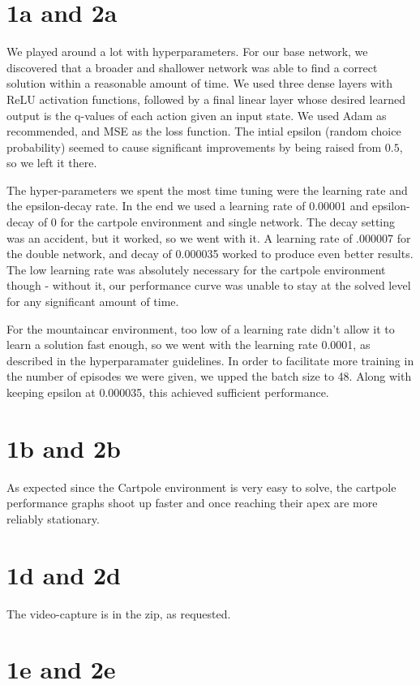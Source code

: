 \documentclass[12pt]{article}
\begin{document}
\begin{solution}
\section{1a and 2a}
We played around a lot with hyperparameters. For our base network, we discovered that a broader and shallower network was able to find a correct solution within a reasonable amount of time. We used three dense layers with ReLU activation functions, followed by a final linear layer whose desired learned output is the q-values of each action given an input state. We used Adam as recommended, and MSE as the loss function. The intial epsilon (random choice probability) seemed to cause significant improvements by being raised from $0.5$, so we left it there.

The hyper-parameters we spent the most time tuning were the learning rate and the epsilon-decay rate. In the end we used a learning rate of 0.00001 and epsilon-decay of 0 for the cartpole environment and single network. The decay setting was an accident, but it worked, so we went with it. A learning rate of .000007 for the double network, and decay of 0.000035 worked to produce even better results. The low learning rate was absolutely necessary for the cartpole environment though - without it, our performance curve was unable to stay at the solved level for any significant amount of time.

For the mountaincar environment, too low of a learning rate didn't allow it to learn a solution fast enough, so we went with the learning rate 0.0001, as described in the hyperparamater guidelines. In order to facilitate more training in the number of episodes we were given, we upped the batch size to 48. Along with keeping epsilon at  0.000035, this achieved sufficient performance.

\section{1b and 2b}

As expected since the Cartpole environment is very easy to solve, the cartpole performance graphs shoot up faster and once reaching their apex are more reliably stationary.

\section{1d and 2d}
The video-capture is in the zip, as requested.

\section{1e and 2e}


\end{solution}
\end{document}
